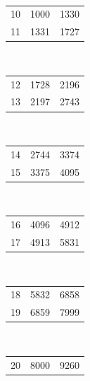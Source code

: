 \documentclass[11pt,reqno]{amsart}
\theoremstyle{blueplain}
\numberwithin{equation}{section}
\begin{document}
{\begin{table}[H]
\begin{tabular}{rrr}
	\end{tabular}%
	\noindent \hspace{1em}\\[0pt]
	\noindent 
	\begin{tabular}{rrr}
		10 & 1000 & \multicolumn{1}{r}{1330} \\ 
		11 & 1331 & \multicolumn{1}{r}{1727} \\ 
		
	\end{tabular}
	\noindent \hspace{1em}\\[0pt]
	\noindent 
	\begin{tabular}{rrr}
		12 & 1728 & 2196 \\ 
		13 & 2197 & 2743 \\ 
		
	\end{tabular}%
	\noindent \hspace{1em}\\[0pt]
	\noindent 
	\begin{tabular}{rrr}
		14 & 2744 & 3374 \\ 
		15 & 3375 & 4095 \\ 
		
	\end{tabular}%
	\noindent \hspace{1em}\\[0pt]
	\noindent 
	\begin{tabular}{rrr}
		16 & 4096 & 4912 \\ 
		17 & 4913 & 5831 \\ 
		
	\end{tabular}%
	\noindent \hspace{1em}\\[0pt]
	\noindent 
	\begin{tabular}{rrr}
		18 & 5832 & 6858 \\ 
		19 & 6859 & 7999 \\ 
		
	\end{tabular}%
	\noindent \hspace{1em}\\[0pt]
	\noindent 
	\begin{tabular}{rrr}
		20 & 8000 & 9260 \\ 
		
	\end{tabular}
\end{table}

\text{\ } \newline
\text{\ } \vspace{0.3in}\text{\ }




}
\end{document}
